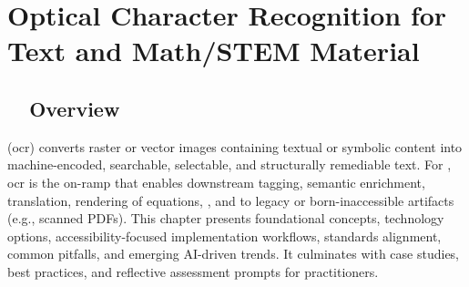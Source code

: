 \chapter{Optical Character Recognition for Text and Math/STEM Material}
\label{chap:ocr}

\section{~~Overview}
\label{sec:ocr-overview}
 (\gls{ocr}) converts raster or vector images containing textual or symbolic content into machine-encoded, searchable, selectable, and structurally remediable text. For , \gls{ocr} is the on-ramp that enables downstream tagging, semantic enrichment,  translation,  rendering of equations,  , and  to legacy or born-inaccessible artifacts (e.g., scanned PDFs). This chapter presents foundational concepts, technology options, accessibility-focused implementation workflows, standards alignment, common pitfalls, and emerging AI-driven trends. It culminates with case studies, best practices, and reflective assessment prompts for practitioners.

